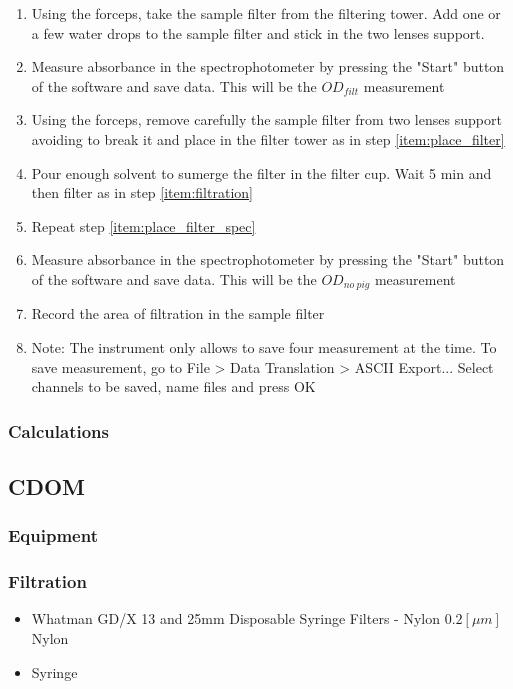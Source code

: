 \begin{appendices}
\begin{enumerate}
  \item \label{item:place_filter_spec} Using the forceps, take the sample filter from the filtering tower. Add one or a few water drops to the sample filter and stick in the two lenses support. 
  \item  Measure absorbance in the spectrophotometer by pressing the "Start" button of the software and save data. This will be the $OD_{filt}$ measurement
  \item Using the forceps, remove carefully the sample filter from two lenses support avoiding to break it and place in the filter tower as in step \ref{item:place_filter}
  \item Pour enough solvent {\color{red} to sumerge} the filter in the filter cup. {\color{red} Wait 5 min} and then filter as in step \ref{item:filtration}
  \item Repeat step \ref{item:place_filter_spec}
  \item Measure absorbance in the spectrophotometer by pressing the "Start" button of the software and save data. This will be the $OD_{no~pig}$ measurement 
  \item Record the area of filtration in the sample filter
  \item[]Note: The instrument only allows to save four measurement at the time. To save measurement, go to File > Data Translation > ASCII Export... {\color{red} Select channels to be saved, name files and press OK}
\end{enumerate}
\subsubsection{Calculations}

\subsection{CDOM}
\subsubsection{Equipment}
\subsubsection*{Filtration}
\begin{itemize}
  \item Whatman GD/X 13 and 25mm Disposable Syringe Filters - Nylon $0.2[\mu m]$ Nylon
  \item {\color{red}Syringe}
\end{itemize}

\end{appendices}
